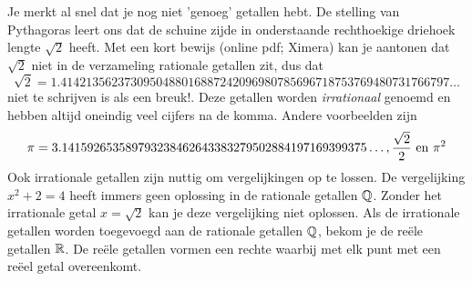 \documentclass{ximera}
\begin{document}
Je merkt al snel dat je nog niet 'genoeg' getallen hebt. 
De stelling van Pythagoras 
leert ons dat de schuine zijde in onderstaande rechthoekige driehoek lengte \( \sqrt{2}\) heeft. 
Met een kort bewijs (online pdf; Ximera) kan je aantonen dat \(\sqrt{2}\) niet in de verzameling rationale getallen zit, dus dat 
\[\sqrt{2} = 1.4142135623730950488016887242096980785696718753769480731766797\ldots%
\]  
niet te schrijven is als een breuk!. 
Deze getallen worden \textit{irrationaal} genoemd en hebben altijd oneindig veel cijfers na de komma.
%
Andere voorbeelden zijn 
\[ \pi = 3.141592653589793238462643383279502884197169399375\ldots%
,
\frac{\sqrt{2}}{2}
\Ten \pi^2 
\]
%
Ook irrationale getallen zijn nuttig om vergelijkingen op te lossen. 
De vergelijking \(x^2 + 2 = 4\) heeft immers geen oplossing in de rationale getallen \( \mathbb{Q} \).
Zonder het irrationale getal \(x = \sqrt{2} \) kan je deze vergelijking niet oplossen.
Als de irrationale getallen worden toegevoegd aan de rationale getallen \(\mathbb{Q}\), bekom je de reële getallen \(\mathbb{R}\). 
De reële getallen vormen een rechte waarbij met elk punt met een reëel getal overeenkomt. 
\end{document}
